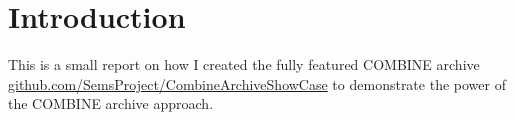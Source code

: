 
\section{Introduction}
This is a small report on how I created the fully featured COMBINE archive
\href{https://github.com/SemsProject/CombineArchiveShowCase}{github.com/SemsProject/CombineArchiveShowCase}
to demonstrate the power of the COMBINE archive approach.

